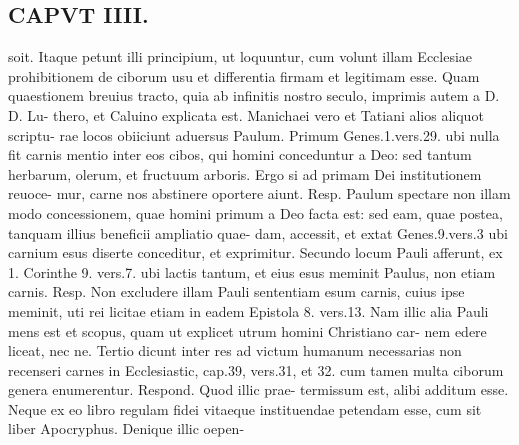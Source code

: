 \documentclass{article}
\begin{document}
\begin{pages}
\section*{CAPVT  IIII. }soit. Itaque petunt illi principium, ut loquuntur, cum volunt illam Ecclesiae prohibitionem de ciborum usu et differentia firmam et legitimam esse. Quam quaestionem breuius tracto, quia ab infinitis nostro seculo, imprimis autem a D. D. Lu- thero, et Caluino explicata est. Manichaei vero et Tatiani alios aliquot scriptu- rae locos obiiciunt aduersus Paulum. Primum Genes.1.vers.29. ubi nulla fit carnis mentio inter eos cibos, qui homini conceduntur a Deo: sed tantum herbarum, olerum, et fructuum arboris. Ergo si ad primam Dei institutionem reuoce- mur, carne nos abstinere oportere aiunt. Resp. Paulum spectare non illam modo concessionem, quae homini primum a Deo facta est: sed eam, quae postea, tanquam illius beneficii ampliatio quae- dam, accessit, et extat Genes.9.vers.3 ubi carnium esus diserte conceditur, et exprimitur. Secundo locum Pauli afferunt, ex 1. Corinthe 9. vers.7. ubi lactis tantum, et eius esus meminit Paulus, non etiam carnis. Resp. Non excludere illam Pauli sententiam esum carnis, cuius ipse meminit, uti rei licitae etiam in eadem Epistola 8. vers.13. Nam illic alia Pauli mens est et scopus, quam ut explicet utrum homini Christiano car- nem edere liceat, nec ne. Tertio dicunt inter res ad victum humanum necessarias non recenseri carnes in Ecclesiastic, cap.39, vers.31, et 32. cum tamen multa ciborum genera enumerentur. Respond. Quod illic prae- termissum est, alibi additum esse. Neque ex eo libro regulam fidei vitaeque instituendae petendam esse, cum sit liber Apocryphus. Denique illic oepen- 

\end{pages}
\end{document}
